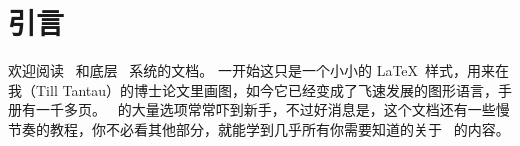 %
%
%


\section{引言}

\begin{onehalfspacing}

欢迎阅读 \tikzname\ 和底层 \pgfname\ 系统的文档。
一开始这只是一个小小的 La\TeX\ 样式，用来在我（Till Tantau）的博士论文里画图，如今它已经变成了飞速发展的图形语言，手册有一千多页。
\tikzname\ 的大量选项常常吓到新手，不过好消息是，这个文档还有一些慢节奏的教程，你不必看其他部分，就能学到几乎所有你需要知道的关于 \tikzname\ 的内容。



\end{onehalfspacing}
